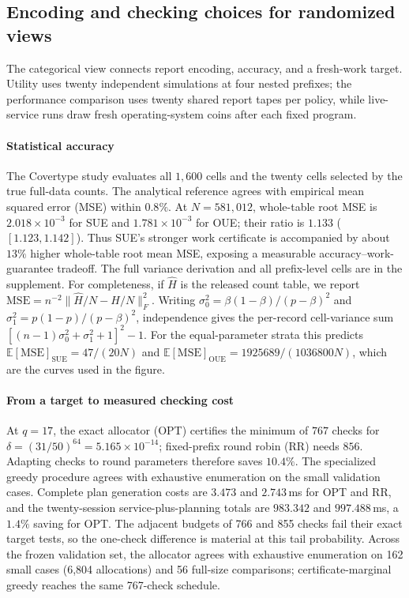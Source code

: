 \subsection{Encoding and checking choices for randomized views}
\label{sec:connected-results}
The categorical view connects report encoding, accuracy, and a fresh-work
target. Utility uses twenty independent simulations at four nested prefixes;
the performance comparison uses twenty shared report tapes per policy, while
live-service runs draw fresh operating-system coins after each fixed program.

\paragraph{Statistical accuracy}
The Covertype study evaluates all $1,600$ cells and
the twenty cells selected by the true full-data counts. The analytical
reference agrees with empirical mean squared error (MSE) within $0.8\%$. At
$N=581{,}012$, whole-table root MSE is $2.018\times10^{-3}$ for SUE
and $1.781\times10^{-3}$ for OUE; their ratio is $1.133$
($[1.123,1.142]$). Thus SUE's stronger work certificate is accompanied by
about $13\%$ higher whole-table root mean MSE, exposing a measurable
accuracy--work-guarantee tradeoff. The full variance derivation and all
prefix-level cells are in the supplement. For completeness, if
$\widehat H$ is the released count table, we report
$\mathrm{MSE}=n^{-2}\lVert\widehat H/N-H/N\rVert_F^2$. Writing
$\sigma_0^2=\beta(1-\beta)/(p-\beta)^2$ and
$\sigma_1^2=p(1-p)/(p-\beta)^2$, independence gives the per-record
cell-variance sum $[(n-1)\sigma_0^2+\sigma_1^2+1]^2-1$.
For the equal-parameter strata this predicts
$\mathbb E[\mathrm{MSE}]_{\mathrm{SUE}}=47/(20N)$ and
$\mathbb E[\mathrm{MSE}]_{\mathrm{OUE}}=1925689/(1036800N)$,
which are the curves used in the figure.

\paragraph{From a target to measured checking cost}
At $q=17$, the exact allocator (OPT) certifies the minimum of $767$ checks for
$\delta=(31/50)^{64}=5.165\times10^{-14}$; fixed-prefix round robin (RR) needs
$856$. Adapting checks to round parameters therefore saves $10.4\%$.
The specialized greedy procedure agrees with exhaustive enumeration on the
small validation cases. Complete plan generation costs are $3.473$ and
$2.743$\,ms for OPT and RR, and the twenty-session service-plus-planning
totals are $983.342$ and $997.488$\,ms, a $1.4\%$ saving for OPT.
The adjacent budgets of 766 and 855 checks fail their exact target tests,
so the one-check difference is material at this tail probability. Across
the frozen validation set, the allocator agrees with exhaustive enumeration
on 162 small cases (6,804 allocations) and 56 full-size comparisons;
certificate-marginal greedy reaches the same 767-check schedule.

